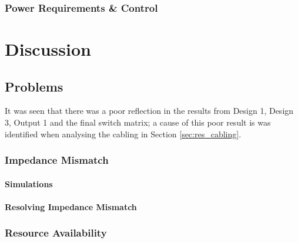 \documentclass[12pt,openany,a4paper]{book}
\begin{document}
\subsection{Power Requirements \& Control}









\chapter{Discussion}
\section{Problems}
It was seen that there was a poor reflection in the results from Design 1, Design 3, Output 1 and the final switch matrix; a cause of this poor result is was identified when analysing the cabling in Section \ref{sec:res_cabling}. 

%		
\subsection{Impedance Mismatch}	\label{sec:imp-mismatch}

\subsubsection{Simulations}


\subsubsection{Resolving Impedance Mismatch}




\subsection{Resource Availability}
\end{document}
